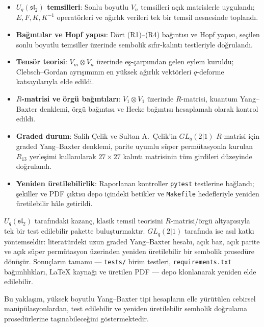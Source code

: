 \documentclass[10pt]{math}
\numberwithin{equation}{section}
\theoremstyle{plain}
\theoremstyle{definition}
\renewcommand{\sl}{\mathfrak{sl}}
\newcommand{\Uq}{U_q(\sl_2)}
\begin{document}
\begin{itemize}[leftmargin=*]
  \item \textbf{$\Uq$ temsilleri}: Sonlu boyutlu $V_n$ temsilleri açık
        matrislerle uygulandı; $E,F,K,K^{-1}$ operatörleri ve ağırlık verileri
        tek bir temsil nesnesinde toplandı.
  \item \textbf{Bağıntılar ve Hopf yapısı}: Dört (R1)--(R4) bağıntısı ve Hopf
        yapısı, seçilen sonlu boyutlu temsiller üzerinde sembolik
        sıfır-kalıntı testleriyle doğrulandı.
  \item \textbf{Tensör teorisi}: $V_m \otimes V_n$ üzerinde eş-çarpımdan gelen
        eylem kuruldu; Clebsch--Gordan ayrışımının en yüksek ağırlık vektörleri
        $q$-deforme katsayılarıyla elde edildi.
  \item \textbf{$R$-matrisi ve örgü bağıntıları}: $V_1 \otimes V_1$ üzerinde
        $R$-matrisi, kuantum Yang--Baxter denklemi, örgü bağıntısı ve Hecke
        bağıntısı hesaplamalı olarak kontrol edildi.
  \item \textbf{Graded durum}: Salih Çelik ve Sultan A.\ Çelik'in
        $GL_q(2|1)$ $R$-matrisi için graded Yang--Baxter denklemi, parite
        uyumlu süper permütasyonla kurulan $R_{13}$ yerleşimi kullanılarak
        $27\times 27$ kalıntı matrisinin tüm girdileri düzeyinde doğrulandı.
  \item \textbf{Yeniden üretilebilirlik}: Raporlanan kontroller
        \texttt{pytest} testlerine bağlandı; şekiller ve PDF çıktısı depo
        içindeki betikler ve \texttt{Makefile} hedefleriyle yeniden üretilebilir
        hâle getirildi.
\end{itemize}

$\Uq$ tarafındaki kazanç, klasik temsil teorisini $R$-matrisi/örgü altyapısıyla
tek bir test edilebilir pakette buluşturmaktır. $GL_q(2|1)$ tarafında ise asıl
katkı yöntemseldir: literatürdeki uzun graded Yang--Baxter hesabı, açık baz,
açık parite ve açık süper permütasyon üzerinden yeniden üretilebilir bir sembolik
prosedüre dönüşür. Sonuçların tamamı --- \texttt{tests/} birim testleri,
\texttt{requirements.txt} bağımlılıkları, LaTeX kaynağı ve üretilen PDF --- depo
klonlanarak yeniden elde edilebilir.

Bu yaklaşım, yüksek boyutlu Yang--Baxter tipi hesapların elle yürütülen
cebirsel manipülasyonlardan, test edilebilir ve yeniden üretilebilir sembolik
doğrulama prosedürlerine taşınabileceğini göstermektedir.
\end{document}

